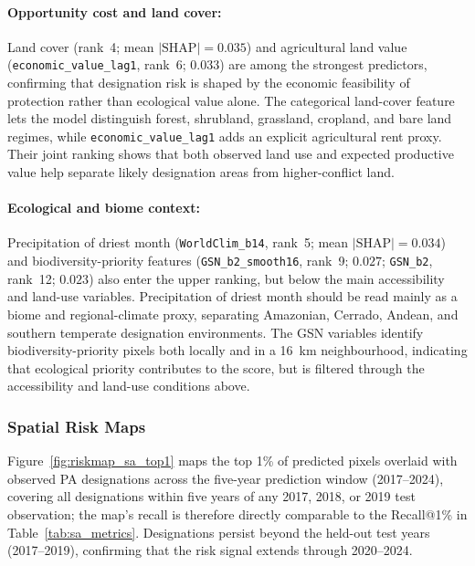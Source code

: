 \documentclass[12pt]{article}
\theoremstyle{break}
\begin{document}
\paragraph{Opportunity cost and land cover:} Land cover (rank~4; mean $|\text{SHAP}|{=}0.035$)
and agricultural land value (\texttt{economic\_value\_lag1}, rank~6; $0.033$) are
among the strongest predictors, confirming that designation risk is shaped by the
economic feasibility of protection rather than ecological value alone. The categorical land-cover
feature lets the model distinguish forest, shrubland, grassland, cropland, and bare
land regimes, while \texttt{economic\_value\_\allowbreak lag1} adds an explicit agricultural rent
proxy. Their joint ranking shows that both observed land use and expected productive
value help separate likely designation areas from higher-conflict land.

\paragraph{Ecological and biome context:} Precipitation of driest month
(\texttt{WorldClim\_b14}, rank~5; mean $|\text{SHAP}|{=}0.034$) and
biodiversity-priority features (\texttt{GSN\_b2\_smooth16}, rank~9; $0.027$;
\texttt{GSN\_b2}, rank~12; $0.023$) also enter the upper ranking, but below the
main accessibility and land-use variables. Precipitation of driest month should be read
mainly as a biome and regional-climate proxy, separating
Amazonian, Cerrado, Andean, and southern temperate designation environments. The GSN
variables identify biodiversity-priority pixels both locally and in a 16~km
neighbourhood, indicating that ecological priority contributes to the score, but is
filtered through the accessibility and land-use conditions above.

\subsubsection{Spatial Risk Maps}
\label{sec:results_sa_maps}

Figure~\ref{fig:riskmap_sa_top1} maps the top 1\% of predicted pixels overlaid
with observed PA designations across the five-year prediction window (2017--2024),
covering all designations within five years of any 2017, 2018, or 2019 test
observation; the map's recall is therefore directly comparable to the Recall@1\%
in Table~\ref{tab:sa_metrics}. Designations persist beyond the held-out test years
(2017--2019), confirming that the risk signal extends through 2020--2024.
\end{document}
